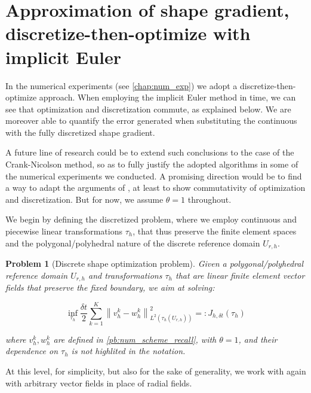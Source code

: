 \documentclass[english,a4paper,9pt,oneside]{scrbook}	%
\theoremstyle{break}
\newtheorem{pb}[equation]{Problem}
\theoremstyle{remark}
\newcommand{\norm}[1]{\left\lVert#1\right\rVert}
\begin{document}
\section{Approximation of shape gradient, discretize-then-optimize with implicit Euler}
\label{sec:d-t-o_IE}

In the numerical experiments (see \cref{chap:num_exp}) we adopt a discretize-then-optimize approach. When employing the implicit Euler method in time, we can see that optimization and discretization commute, as explained below. We are moreover able to quantify the error generated when substituting the continuous with the fully discretized shape gradient. 

A future line of research could be to extend such conclusions to the case of the Crank-Nicolson method, so as to fully justify the adopted algorithms in some of the numerical experiments we conducted. A promising direction would be to find a way to adapt the arguments of \cite{flaig}, at least to show commutativity of optimization and discretization. But for now, we assume $\theta = 1$ throughout.

We begin by defining the discretized problem, where we employ continuous and piecewise linear transformations $\tau_h$, that thus preserve the finite element spaces and the polygonal/polyhedral nature of the discrete reference domain $U_{r,h}$.

\begin{pb}[Discrete shape optimization problem]
\label{pb:discr_shopt}
Given a polygonal/polyhedral reference domain $U_{r,h}$ and transformations $\tau_h$ that are linear finite element vector fields that preserve the fixed boundary, we aim at solving:

$$\inf_{\tau_h }\frac{\delta t}{2}\sum_{k=1}^{K}\norm{v_h^k-w^k_h}_{L^2(\tau_h(U_{r,h}))}^2=:J_{h,\delta t}(\tau_h)$$


where $v_h^k, w^k_h$ are defined in \cref{pb:num_scheme_recall}, with $\theta=1$, and their dependence on $\tau_h$ is not highlited in the notation.

\end{pb}

At this level, for simplicity, but also for the sake of generality, we work with again with arbitrary vector fields in place of radial fields.
\end{document}
